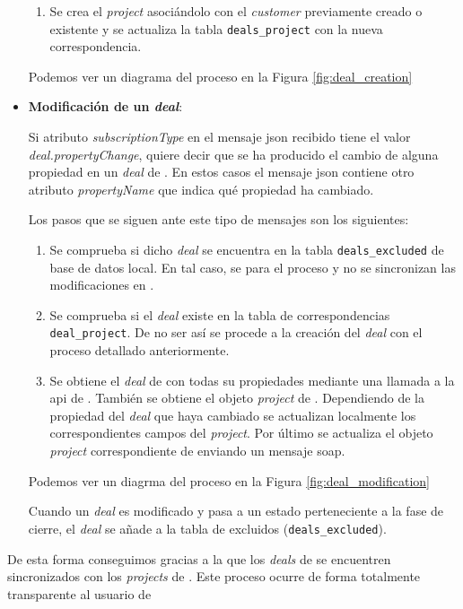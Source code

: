 \begin{itemize}
\begin{enumerate}
			\item Se crea el \textit{project} asociándolo con el \textit{customer} previamente creado o existente y se actualiza la tabla \texttt{deals\_project} con la nueva correspondencia.
		\end{enumerate}
		
		Podemos ver un diagrama del proceso en la Figura \ref{fig:deal_creation}
		
		
		
		
		
		
	\item \textbf{Modificación de un \textit{deal}}:
	
		Si atributo \textit{subscriptionType} en el mensaje \acrshort{json} recibido tiene el valor \textit{deal.propertyChange}, quiere decir que se ha producido el cambio de alguna propiedad en un \textit{deal} de \hs{}. En estos casos el mensaje \acrshort{json} contiene otro atributo  \textit{propertyName} que indica qué propiedad ha cambiado.
		
		Los pasos que se siguen ante este tipo de mensajes son los siguientes:
		
		\begin{enumerate}
			\item Se comprueba si dicho \textit{deal} se encuentra en la tabla \texttt{deals\_excluded} de base de datos local. En tal caso, se para el proceso y no se sincronizan las modificaciones en \wday{}.
			\item Se comprueba si el \textit{deal} existe en la tabla de correspondencias \texttt{deal\_project}. De no ser así se procede a la creación del \textit{deal} con el proceso detallado anteriormente.
			\item Se obtiene el \textit{deal} de \hs{} con todas su propiedades mediante una llamada a la \acrshort{api} de \hs{}. También se obtiene el objeto \textit{project} de \wday{}. Dependiendo de la propiedad del \textit{deal} que haya cambiado se actualizan localmente los correspondientes campos del \textit{project}. Por último se actualiza el objeto \textit{project} correspondiente de \wday{} enviando un mensaje \acrshort{soap}.
		\end{enumerate}
		
		Podemos ver un diagrma del proceso en la Figura \ref{fig:deal_modification}
		
		
		
		Cuando un \textit{deal} es modificado y pasa a un estado perteneciente a la fase de cierre, el \textit{deal} se añade a la tabla de excluidos (\texttt{deals\_excluded}).\\
		
		
		
		
			
\end{itemize}


De esta forma conseguimos gracias a la \iface{} que los \textit{deals} de \hs{} se encuentren sincronizados con los \textit{projects} de \wday{}. 
Este proceso ocurre de forma totalmente transparente al usuario de \hs{}


